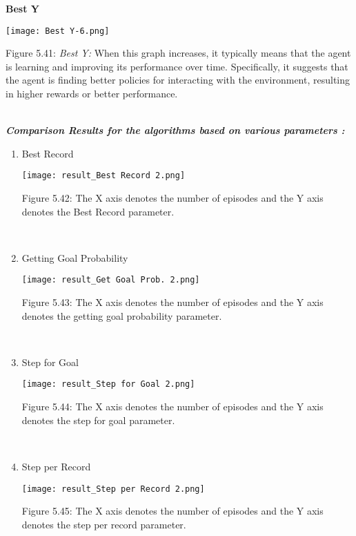 \documentclass[conference]{IEEEtran}
\begin{document}
\textbf{Best Y}\\

\graphicspath{ {./images/} }
\texttt{[image: Best Y-6.png]}
\caption{Figure 5.41: \textit{Best Y: }When this graph increases, it typically means that the agent is learning and improving its performance over time. Specifically, it suggests that the agent is finding better policies for interacting with the environment, resulting in higher rewards or better performance.
}\\



\textbf{\textit{Comparison Results for the algorithms based on various parameters : }}
\begin{enumerate}
    \item Best Record\\
    \graphicspath{ {./images/} }
    \texttt{[image: result\_Best Record 2.png]}
    \caption{Figure 5.42: The X axis denotes the number of episodes and the Y axis denotes the Best Record parameter.\\
    }\\

    \item Getting Goal Probability\\
    \graphicspath{ {./images/} }
    \texttt{[image: result\_Get Goal Prob. 2.png]}
    \caption{Figure 5.43: The X axis denotes the number of episodes and the Y axis denotes the getting goal probability parameter.\\
    }\\

    \item Step for Goal\\
    \graphicspath{ {./images/} }
    \texttt{[image: result\_Step for Goal 2.png]}
    \caption{Figure 5.44: The X axis denotes the number of episodes and the Y axis denotes the step for goal parameter.\\
    }\\

    \item Step per Record\\
    \graphicspath{ {./images/} }
    \texttt{[image: result\_Step per Record 2.png]}
    \caption{Figure 5.45: The X axis denotes the number of episodes and the Y axis denotes the step per record parameter.\\
    }\\


\end{enumerate}
\end{document}
